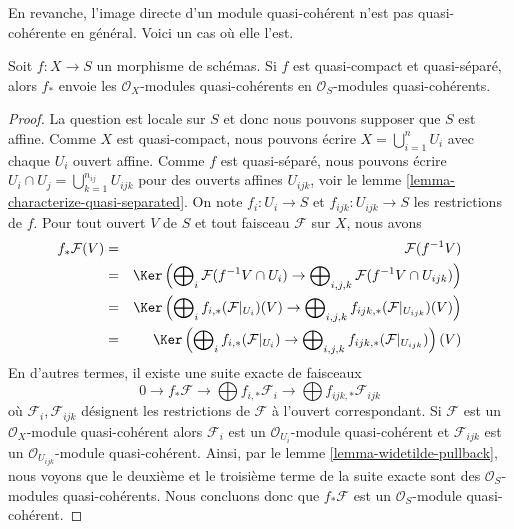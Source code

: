 En revanche, l'image directe d'un module
quasi-cohérent n'est pas quasi-cohérente en général.
Voici un cas où elle l'est.

\begin{lemma}
\label{lemma-push-forward-quasi-coherent}
Soit $f : X \to S$ un morphisme de schémas.
Si $f$ est quasi-compact et quasi-séparé, alors
$f_*$ envoie les $\mathcal{O}_X$-modules quasi-cohérents
en $\mathcal{O}_S$-modules quasi-cohérents.
\end{lemma}

\begin{proof}
La question est locale sur $S$ et donc nous pouvons supposer que
$S$ est affine. Comme $X$ est quasi-compact, nous pouvons
écrire $X = \bigcup_{i = 1}^n U_i$ avec chaque $U_i$ ouvert affine.
Comme $f$ est quasi-séparé, nous pouvons
écrire $U_i \cap U_j = \bigcup_{k = 1}^{n_{ij}} U_{ijk}$ pour des
ouverts affines $U_{ijk}$, voir le lemme \ref{lemma-characterize-quasi-separated}.
On note $f_i : U_i \to S$ et $f_{ijk} : U_{ijk} \to S$ les
restrictions de $f$. Pour tout ouvert $V$ de $S$ et tout faisceau
$\mathcal{F}$ sur $X$, nous avons
\begin{eqnarray*}
f_*\mathcal{F}(V) & = & \mathcal{F}(f^{-1}V) \\ &
= &
\Ker\left(
\bigoplus\nolimits_i \mathcal{F}(f^{-1}V \cap U_i)
\to
\bigoplus\nolimits_{i, j, k} \mathcal{F}(f^{-1}V \cap U_{ijk})\right) \\
& = &
\Ker\left(
\bigoplus\nolimits_i f_{i, *}(\mathcal{F}|_{U_i})(V)
\to
\bigoplus\nolimits_{i, j, k} f_{ijk, *}(\mathcal{F}|_{U_{ijk}})(V)\right) \\
& = &
\Ker\left(
\bigoplus\nolimits_i f_{i, *}(\mathcal{F}|_{U_i})
\to
\bigoplus\nolimits_{i, j, k} f_{ijk, *}(\mathcal{F}|_{U_{ijk}})\right)(V)
\end{eqnarray*}
En d'autres termes, il existe une suite exacte de faisceaux
$$
0 \to f_*\mathcal{F}
\to \bigoplus f_{i, *}\mathcal{F}_i
\to \bigoplus f_{ijk, *}\mathcal{F}_{ijk}
$$
où $\mathcal{F}_i, \mathcal{F}_{ijk}$ désignent les
restrictions de $\mathcal{F}$ à l'ouvert correspondant. Si
$\mathcal{F}$ est un $\mathcal{O}_X$-module quasi-cohérent alors
$\mathcal{F}_i$ est un $\mathcal{O}_{U_i}$-module quasi-cohérent et
$\mathcal{F}_{ijk}$ est un $\mathcal{O}_{U_{ijk}}$-module quasi-cohérent. Ainsi, par le
lemme \ref{lemma-widetilde-pullback}, nous voyons que le deuxième et le
troisième terme de la suite exacte sont des $\mathcal{O}_S$-modules
quasi-cohérents. Nous concluons donc que
$f_*\mathcal{F}$ est un $\mathcal{O}_S$-module quasi-cohérent.
\end{proof}

